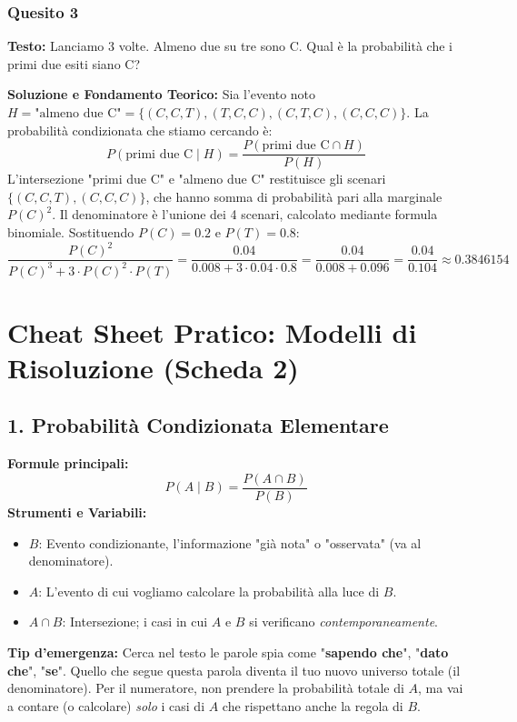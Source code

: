 \documentclass[12pt, a4paper]{article}
\begin{document}
\subsubsection*{Quesito 3}
\textbf{Testo:} Lanciamo 3 volte. Almeno due su tre sono C. Qual è la probabilità che i primi due esiti siano C?

\textbf{Soluzione e Fondamento Teorico:} 
Sia l'evento noto $H = \text{"almeno due C"} = \{(C,C,T), (T,C,C), (C,T,C), (C,C,C)\}$.
La probabilità condizionata che stiamo cercando è:
$$ P(\text{primi due C} \mid H) = \frac{P(\text{primi due C} \cap H)}{P(H)} $$
L'intersezione "primi due C" e "almeno due C" restituisce gli scenari $\{(C,C,T), (C,C,C)\}$, che hanno somma di probabilità pari alla marginale $P(C)^2$. Il denominatore è l'unione dei 4 scenari, calcolato mediante formula binomiale. Sostituendo $P(C) = 0.2$ e $P(T) = 0.8$:
$$ \frac{P(C)^2}{P(C)^3 + 3 \cdot P(C)^2 \cdot P(T)} = \frac{0.04}{0.008 + 3 \cdot 0.04 \cdot 0.8} = \frac{0.04}{0.008 + 0.096} = \frac{0.04}{0.104} \approx 0.3846154 $$


\section*{Cheat Sheet Pratico: Modelli di Risoluzione (Scheda 2)}

\subsection*{1. Probabilità Condizionata Elementare}
\textbf{Formule principali:}
$$ P(A \mid B) = \frac{P(A \cap B)}{P(B)} $$
\textbf{Strumenti e Variabili:}
\begin{itemize}
    \item $B$: Evento condizionante, l'informazione "già nota" o "osservata" (va al denominatore).
    \item $A$: L'evento di cui vogliamo calcolare la probabilità alla luce di $B$.
    \item $A \cap B$: Intersezione; i casi in cui $A$ e $B$ si verificano \textit{contemporaneamente}.
\end{itemize}
\textbf{Tip d'emergenza:} Cerca nel testo le parole spia come "\textbf{sapendo che}", "\textbf{dato che}", "\textbf{se}". Quello che segue questa parola diventa il tuo nuovo universo totale (il denominatore). Per il numeratore, non prendere la probabilità totale di $A$, ma vai a contare (o calcolare) \textit{solo} i casi di $A$ che rispettano anche la regola di $B$.
\end{document}
